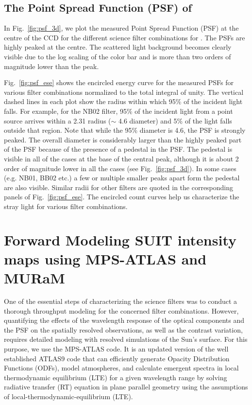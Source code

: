 \subsection{The Point Spread Function (PSF) of {\suit}} \label{sec:psf}
In Fig.~\ref{fig:psf_3d}, we plot the measured Point Spread Function (PSF) at the centre of the CCD for the different science filter combinations for {\suit}. The PSFs are highly peaked at the centre. The scattered light background becomes clearly visible due to the log scaling of the color bar and is more than two orders of magnitude lower than the peak.

Fig.~\ref{fig:psf_ese} shows the encircled energy curve for the measured PSFs for various filter combinations normalized to the total integral of unity. The vertical dashed lines in each plot show the radius within which 95\% of the incident light falls. For example, for the NB02 filter, 95\% of the incident light from a point source arrives within a 2.31{\arcsec} radius ($\sim$ 4.6{\arcsec} diameter) and 5\% of the light falls outside that region. Note that while the 95\% diameter is 4.6{\arcsec}, the PSF is strongly peaked. The overall diameter is considerably larger than the highly peaked part of the PSF because of the presence of a pedestal in the PSF. The pedestal is visible in all of the cases at the base of the central peak, although it is about 2 order of magnitude lower in all the cases (see Fig.~\ref{fig:psf_3d}). In some cases (e.g. NB01, BB02 etc.) a few or multiple smaller peaks apart form the pedestal are also visible. Similar radii for other filters are quoted in the corresponding panels of Fig.~\ref{fig:psf_ese}. The encircled count curves help us characterize the stray light for various filter combinations.

\section{Forward Modeling SUIT intensity maps using MPS-ATLAS and MURaM} \label{sec:mps}

One of the essential steps of characterizing the science filters was to conduct a thorough throughput modeling for the concerned filter combinations. However, quantifying the effects of the wavelength response of the optical components and the PSF on the spatially resolved observations, as well as the contrast variation, requires detailed modeling with resolved simulations of the Sun's surface. For this purpose, we use the MPS-ATLAS code. It is an updated version of the well established ATLAS9 \citep{atlas9} code that can efficiently generate Opacity Distribution Functions (ODFs), model atmospheres, and calculate emergent spectra in local thermodynamic equilibrium (LTE) for a given wavelength range by solving radiative transfer (RT) equation in plane parallel geometry using the assumptions of local-thermodynamic-equilibrium (LTE).

